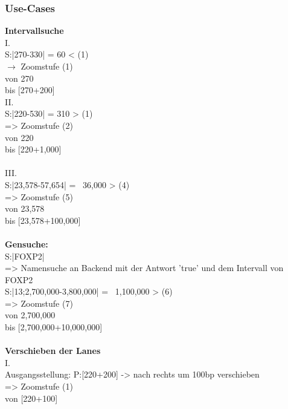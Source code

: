 \documentclass{scrartcl}
\begin{document}
\subsubsection{Use-Cases}
\textbf{Intervallsuche}\\
I.\\
S:|270-330| = 60 < (1)\\
$\rightarrow$  Zoomstufe (1)\\
\hspace*{0.6cm} von 270\\
\hspace*{0.6cm} bis [270+200]
\newpage\hfill\\
II.\\
S:|220-530| = 310 > (1)\\
=>  Zoomstufe (2)\\
\hspace*{0.6cm} von 220\\
\hspace*{0.6cm} bis [220+1,000]\\
\\
III.\\
S:|23,578-57,654| = ~36,000 > (4)\\
=>  Zoomstufe (5)\\
\hspace*{0.6cm} von 23,578\\
\hspace*{0.6cm} bis [23,578+100,000]\\
\\
\textbf{Gensuche:}\\
S:|FOXP2|\\
=>  Namensuche an Backend mit der Antwort 'true' und dem Intervall von FOXP2\\
S:|13;2,700,000-3,800,000| = ~1,100,000 > (6)\\
=>  Zoomstufe (7)\\
\hspace*{0.6cm} von 2,700,000\\
\hspace*{0.6cm} bis [2,700,000+10,000,000]\\
\\
\textbf{Verschieben der Lanes}\\
I.\\
Ausgangsstellung: P:[220+200] -> nach rechts um 100bp verschieben\\
=>  Zoomstufe (1)\\
\hspace*{0.6cm} von [220+100]\\
\end{document}
